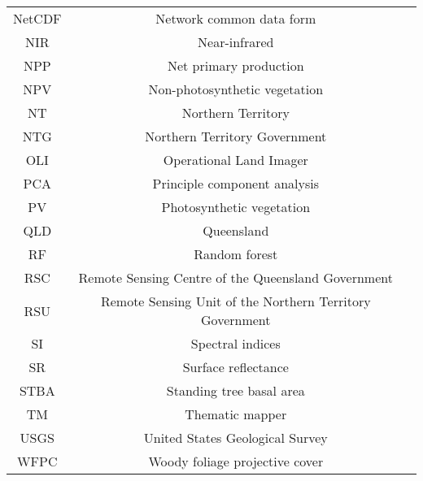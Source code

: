 \begin{table}[h!]
\begin{tabular*}{\textwidth}{c @{\extracolsep{\fill}} c c}
  NetCDF & Network common data form \\
  NIR & Near-infrared \\
  NPP & Net primary production \\
  NPV & Non-photosynthetic vegetation \\
  NT & Northern Territory \\ 
  NTG & Northern Territory Government \\ 
  OLI &  Operational Land Imager \\ 
  PCA & Principle component analysis \\
  PV & Photosynthetic vegetation \\
  QLD & Queensland \\
  RF & Random forest \\
  RSC & Remote Sensing Centre of the Queensland Government \\
  RSU & Remote Sensing Unit of the Northern Territory Government \\ 
  SI & Spectral indices \\
  SR & Surface reflectance \\
  STBA & Standing tree basal area \\ 
  TM &  Thematic mapper\\ 
  USGS & United States Geological Survey \\
  WFPC & Woody foliage projective cover \\


 \hline
\end{tabular*}

\end{table}
